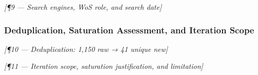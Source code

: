 \bigskip\noindent\textit{[¶9 — Search engines, WoS role, and search date]}

\subsubsection{Deduplication, Saturation Assessment, and Iteration Scope}
\label{sec:methodology:snowballing:saturation}


\bigskip\noindent\textit{[¶10 — Deduplication: 1,150 raw → 41 unique new]}

%

\bigskip\noindent\textit{[¶11 — Iteration scope, saturation justification, and limitation]}

